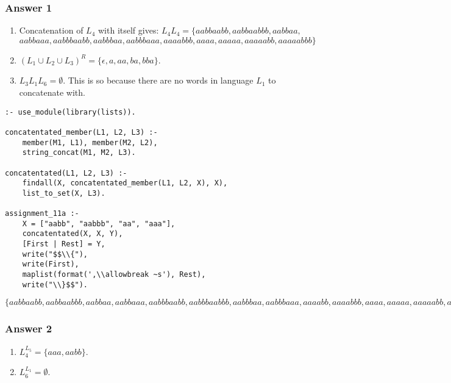 \documentclass[11pt]{article}
\begin{document}
\subsubsection{Answer 1}
\label{sec:orgheadline1}
\begin{enumerate}
\item Concatenation of \(L_4\) with itself gives:
\(L_4L_4 = \{aabbaabb, aabbaabbb, aabbaa,\;\) \(aabbaaa, aabbbaabb,
       aabbbaa, aabbbaaa, aaaabbb, aaaa, aaaaa, aaaaabb, aaaaabbb\}\)
\item \((L_1 \cup L_2 \cup L_3)^R = \{\epsilon, a, aa, ba, bba\}\).
\item \(L_3L_1L_6 = \emptyset\).  This is so because there are no words
in language \(L_1\) to concatenate with.
\end{enumerate}


\lstset{language=prolog,label= ,caption= ,captionpos=b,numbers=none}
\begin{lstlisting}
:- use_module(library(lists)).

concatentated_member(L1, L2, L3) :-
    member(M1, L1), member(M2, L2),
    string_concat(M1, M2, L3).

concatentated(L1, L2, L3) :-
    findall(X, concatentated_member(L1, L2, X), X),
    list_to_set(X, L3).

assignment_11a :-
    X = ["aabb", "aabbb", "aa", "aaa"],
    concatentated(X, X, Y),
    [First | Rest] = Y,
    write("$$\\{"),
    write(First),
    maplist(format(',\\allowbreak ~s'), Rest),
    write("\\}$$").
\end{lstlisting}

\(\{aabbaabb,\allowbreak aabbaabbb,\allowbreak aabbaa,\allowbreak aabbaaa,\allowbreak aabbbaabb,\allowbreak aabbbaabbb,\allowbreak aabbbaa,\allowbreak aabbbaaa,\allowbreak aaaabb,\allowbreak aaaabbb,\allowbreak aaaa,\allowbreak aaaaa,\allowbreak aaaaabb,\allowbreak aaaaabbb,\allowbreak aaaaaa\}\)

\subsubsection{Answer 2}
\label{sec:orgheadline2}
\begin{enumerate}
\item \(L_4^{L_5} = \{aaa, aabb\}\).
\item \(L_6^{L_1} = \emptyset\).
\end{enumerate}
\end{document}
